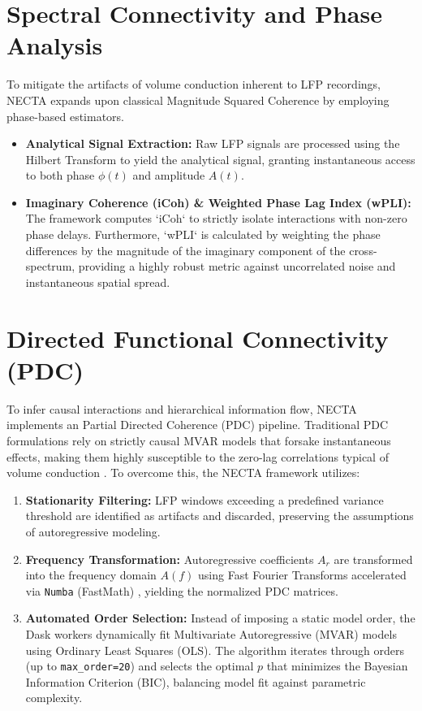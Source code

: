\section{Spectral Connectivity and Phase Analysis}
To mitigate the artifacts of volume conduction inherent to LFP recordings, NECTA expands upon classical Magnitude Squared Coherence by employing phase-based estimators.
\begin{itemize}
\item \textbf{Analytical Signal Extraction:} Raw LFP signals are processed using the Hilbert Transform to yield the analytical signal, granting instantaneous access to both phase $\phi(t)$ and amplitude $A(t)$.

\item \textbf{Imaginary Coherence (iCoh) \& Weighted Phase Lag Index (wPLI):} The framework computes `iCoh` to strictly isolate interactions with non-zero phase delays. Furthermore, `wPLI` is calculated by weighting the phase differences by the magnitude of the imaginary component of the cross-spectrum, providing a highly robust metric against uncorrelated noise and instantaneous spatial spread.
\end{itemize}

\section{Directed Functional Connectivity (PDC)}
To infer causal interactions and hierarchical information flow, NECTA implements an Partial Directed Coherence (PDC) pipeline. Traditional PDC formulations rely on strictly causal MVAR models that forsake instantaneous effects, making them highly susceptible to the zero-lag correlations typical of volume conduction \cite{Faes_2010}. To overcome this, the NECTA framework utilizes:
\begin{enumerate}
    \item \textbf{Stationarity Filtering:} LFP windows exceeding a predefined variance threshold are identified as artifacts and discarded, preserving the assumptions of autoregressive modeling.
    
    \item \textbf{Frequency Transformation:} Autoregressive coefficients $A_r$ are transformed into the frequency domain $A(f)$ using Fast Fourier Transforms accelerated via \texttt{Numba} (FastMath) \cite{lam2015numba}, yielding the normalized PDC matrices.

    \item \textbf{Automated Order Selection:} Instead of imposing a static model order, the Dask workers dynamically fit Multivariate Autoregressive (MVAR) models using Ordinary Least Squares (OLS). The algorithm iterates through orders (up to \texttt{max\_order=20}) and selects the optimal $p$ that minimizes the Bayesian Information Criterion (BIC), balancing model fit against parametric complexity.
\end{enumerate}

